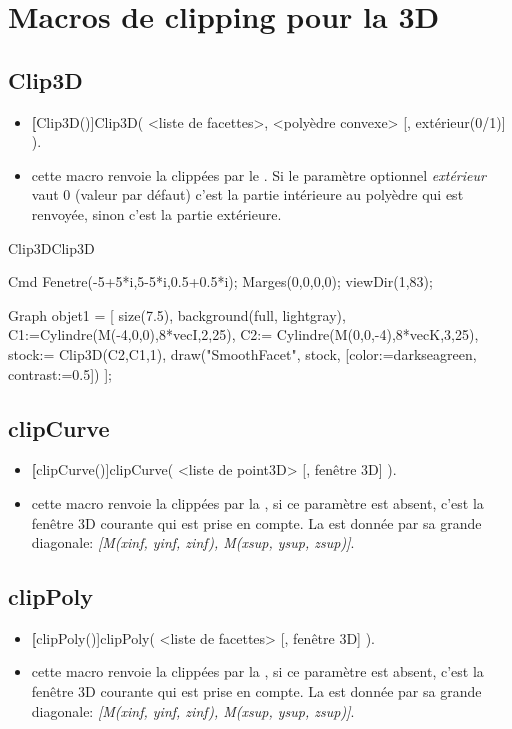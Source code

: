 \section{Macros de clipping pour la 3D}

\subsection{Clip3D}
\begin{itemize}
 \item \util \textbf[Clip3D()]{Clip3D( <liste de facettes>, <polyèdre convexe> [, extérieur(0/1)] )}.
 \item \desc cette macro renvoie la  clippées par le . Si le paramètre optionnel \textit{extérieur} vaut 0 (valeur par défaut) c'est la partie intérieure au polyèdre qui est renvoyée, sinon c'est la partie extérieure.
\end{itemize}

\pngtrue
\begin{demo}{Clip3D}{Clip3D}
\begin{texgraph}[name=Clip3D, export=eps, file]
Cmd Fenetre(-5+5*i,5-5*i,0.5+0.5*i);
   Marges(0,0,0,0);
   viewDir(1,83);

Graph objet1 = [ size(7.5),
  background(full, lightgray),
  C1:=Cylindre(M(-4,0,0),8*vecI,2,25),
  C2:= Cylindre(M(0,0,-4),8*vecK,3,25),
  stock:= Clip3D(C2,C1,1),
  draw("SmoothFacet", stock,
          [color:=darkseagreen,
           contrast:=0.5])
];
\end{texgraph}
\end{demo}
\pngfalse

\subsection{clipCurve}
\begin{itemize}
 \item \util \textbf[clipCurve()]{clipCurve( <liste de point3D> [, fenêtre 3D] )}.
 \item \desc cette macro renvoie la  clippées par la , si ce paramètre est absent, c'est la fenêtre 3D courante qui est prise en compte. La  est donnée par sa grande diagonale: \textsl{[M(xinf, yinf, zinf), M(xsup, ysup, zsup)]}.
\end{itemize}

\subsection{clipPoly}
\begin{itemize}
 \item \util \textbf[clipPoly()]{clipPoly( <liste de facettes> [, fenêtre 3D] )}.
 \item \desc cette macro renvoie la  clippées par la , si ce paramètre est absent, c'est la fenêtre 3D courante qui est prise en compte. La  est donnée par sa grande diagonale: \textsl{[M(xinf, yinf, zinf), M(xsup, ysup, zsup)]}.
\end{itemize}

